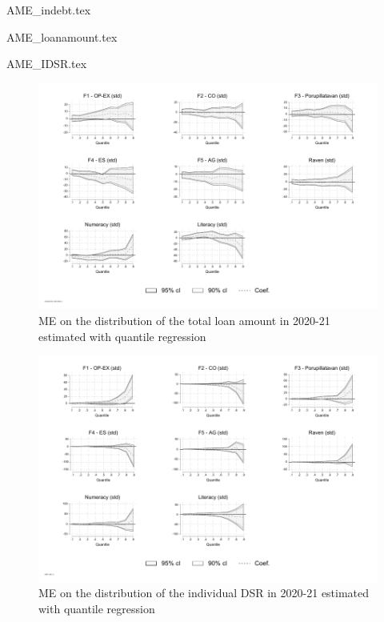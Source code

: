 \documentclass[a4paper, 12pt, onecolumn]{article}
\begin{document}
{AME_indebt.tex}

{AME_loanamount.tex}

{AME_IDSR.tex}

\begin{figure}[!h]
\raggedright
\includegraphics[width=\textwidth]{INPUT/qreg_loanamount_indiv1000_2}
\caption{ME on the distribution of the total loan amount in 2020-21 estimated with quantile regression}
\label{fig:qreg_loanamount}
\end{figure}

\begin{figure}[!h]
\raggedright
\includegraphics[width=\textwidth]{INPUT/qreg_DSR_indiv_2}
\caption{ME on the distribution of the individual DSR in 2020-21 estimated with quantile regression}
\label{fig:qreg_dsr}
\end{figure}
\end{document}
